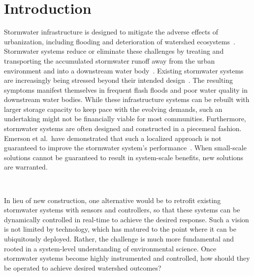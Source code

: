\chapter{Introduction}\label{ch:introduction}
Stormwater infrastructure is designed to mitigate the adverse effects of urbanization, including flooding and deterioration of watershed ecosystems~\cite{national2009urban, randhir2009urbanization}.
Stormwater systems reduce or eliminate these challenges by treating and transporting the accumulated stormwater runoff away from the urban environment and into a downstream water body~\cite{national2009urban}.
Existing stormwater systems are increasingly being stressed beyond their intended design~\cite{kerkez2016, national2009urban}.
The resulting symptoms manifest themselves in frequent flash floods\cite{LarisKarklisBefore-and-afterPost} and poor water quality in downstream water bodies\cite{Watson2016TheHypoxia}.
While these infrastructure systems can be rebuilt with larger storage capacity to keep pace with the evolving demands, such an undertaking might not be financially viable for most communities\cite{kerkez2016}.
Furthermore, stormwater systems are often designed and constructed in a piecemeal fashion.
Emerson et al.\ have demonstrated that such a localized approach is not guaranteed to improve the stormwater system's performance~\cite{Emerson2005Watershed-ScaleBasins}.
When small-scale solutions cannot be guaranteed to result in system-scale benefits,  new solutions are warranted.

\

In lieu of new construction, one alternative would be to retrofit existing stormwater systems with sensors and controllers, so that these systems can be dynamically controlled in real-time to achieve the desired response\cite{kerkez2016, Mullapudi_Wong_Kerkez_2017}.
Such a vision is not limited by technology, which has matured to the point where it can be ubiquitously deployed\cite{Bartos_2018}.
Rather, the challenge is much more fundamental and rooted in a system-level understanding of environmental science.
Once stormwater systems become highly instrumented and controlled, how should they be operated to achieve desired watershed outcomes?

